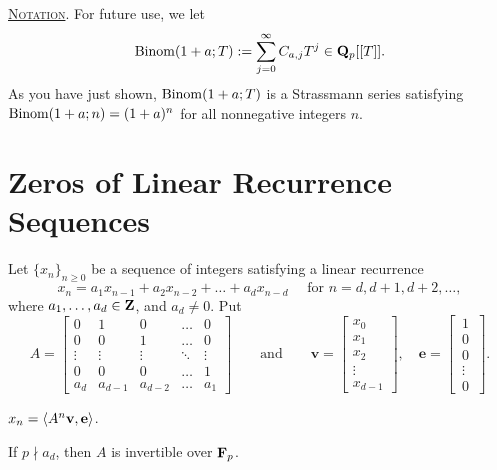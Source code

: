 \underline{\textsc{Notation}}. For future use, we let $$\Binom(1+a;T) := \sum_{j=0}^{\infty} C_{a,j} T^j \in \Q_p[[T]].\index{$\Binom(1+a;T)$|see{Strassmann series representing $(1+a)^n$}}$$ As you have just shown, $\mathrm{Binom}(1+a;T)$ is a Strassmann series satisfying $\mathrm{Binom}(1+a;n) = (1+a)^n$ for all nonnegative integers $n$.





\vspace{-0.15in}
\section*{Zeros of Linear Recurrence Sequences}

Let $\{x_n\}_{n\ge 0}$ be a sequence of integers satisfying a linear recurrence
\[ x_{n} = a_1 x_{n-1} + a_2 x_{n-2} + \dots + a_d x_{n-d} \quad\text{ for $n=d,d+1,d+2,\dots$}, \]
where $a_1, \dots, a_d\in \mathbf{Z}$, and $a_d \ne 0$. Put 
\[ A = \left[\begin{matrix} 
0 & 1 & 0  & \hdots & 0\\
0 & 0 & 1  & \hdots & 0 \\
\vdots & \vdots & \vdots & \ddots & \vdots \\
0 & 0 & 0 & \hdots & 1 \\
a_d & a_{d-1} & a_{d-2} & \hdots & a_1
\end{matrix}\right]\qquad\text{and}\qquad \textbf{v} = \left[ 
\begin{matrix}
x_0 \\
x_1 \\
x_2 \\
\vdots \\
x_{d-1}
\end{matrix}
\right], \quad \textbf{e} = 
\left[\,\begin{matrix}
1 \\
0 \\
0 \\
\vdots \\
0
\end{matrix}\,\right].
\]
\begin{prob}\label{prob:matrixmult} $x_{n} = \langle A^n\mathbf{v}, \mathbf{e}\rangle$.\end{prob}

\begin{prob}\label{prob:pinvertible} If $p\nmid a_d$, then $A$ is invertible over $\mathbf{F}_p$.
\end{prob}

